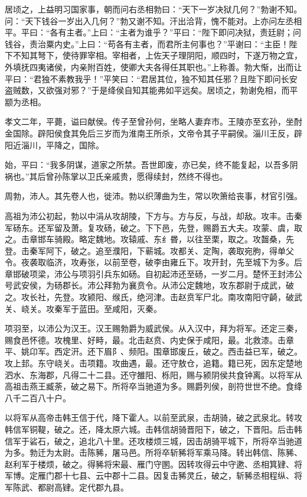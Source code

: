 \documentclass[]{article}
\begin{document}
居顷之，上益明习国家事，朝而问右丞相勃曰：``天下一岁决狱几何？''勃谢不知。问：``天下钱谷一岁出入几何？''勃又谢不知。汗出洽背，愧不能对。上亦问左丞相平。平曰：``各有主者。''上曰：``主者为谁乎？''平曰：``陛下即问决狱，责廷尉；问钱谷，责治粟内史。''上曰：``苟各有主者，而君所主何事也？''平谢曰：``主臣！陛下不知其弩下，使待罪宰相。宰相者，上佐天子理阴阳，顺四时，下遂万物之宜，外填抚四夷诸侯，内亲附百姓，使卿大夫各得任其职也。''上称善。勃大惭，出而让平曰：``君独不素教我乎！''平笑曰：``君居其位，独不知其任邪？且陛下即问长安盗贼数，又欲强对邪？''于是绛侯自知其能弗如平远矣。居顷之，勃谢免相，而平颛为丞相。

孝文二年，平薨，谥曰献侯。传子至曾孙何，坐略人妻弃市。王陵亦至玄孙，坐酎金国除。辟阳侯食其免后三岁而为淮南王所杀，文帝令其子平嗣侯。淄川王反，辟阳近淄川，平降之，国除。

始，平曰：``我多阴谋，道家之所禁。吾世即废，亦已矣，终不能复起，以吾多阴祸也。''其后曾孙陈掌以卫氏亲戚贵，愿得续封，然终不得也。

周勃，沛人。其先卷人也，徙沛。勃以织薄曲为生，常以吹箫给丧事，材官引强。

高祖为沛公初起，勃以中涓从攻胡陵，下方与。方与反，与战，却敌。攻丰。击秦军砀东。还军留及萧。复攻砀，破之。下下邑，先登，赐爵五大夫。攻蒙、虞，取之。击章邯车骑殿。略定魏地。攻辕戚、东纟昬，以往至栗，取之。攻齧桑，先登。击秦军阿下，破之。追至濮阳，下蕲城。攻都关、定陶，袭取宛朐，得单父令。夜袭取临济，攻寿张，以前至卷，破李由雍丘下。攻开封，先至城下为多。后章邯破项梁，沛公与项羽引兵东如砀。自初起沛还至砀，一岁二月。楚怀王封沛公号武安侯，为砀郡长。沛公拜勃为襄贲令。从沛公定魏地，攻东郡尉于成武，破之。攻长社，先登。攻颍阳、缑氏，绝河津。击赵贲军尸北。南攻南阳守齮，破武关、峣关。攻秦军于蓝田。至咸阳，灭秦。

项羽至，以沛公为汉王。汉王赐勃爵为威武侯。从入汉中，拜为将军。还定三秦，赐食邑怀德。攻槐里、好畤，最。北击赵贲、内史保于咸阳，最。北救漆。击章平、姚卬军。西定汧。还下眉阝、频阳。围章邯废丘，破之。西击益已军，破之。攻上邽。东守峣关。击项籍。攻曲遇，最。还守敖仓，追籍。籍已死，因东定楚地泗水、东海郡，凡得二十二县。还守雒阳、栎阳，赐与颍阴侯共食钟离。以将军从高祖击燕王臧荼，破之易下。所将卒当驰道为多。赐爵列侯，剖符世世不绝。食绛八千二百八十户。

以将军从高帝击韩王信于代，降下霍人。以前至武泉，击胡骑，破之武泉北。转攻韩信军铜鞮，破之。还，降太原六城。击韩信胡骑晋阳下，破之，下晋阳。后击韩信军于硰石，破之，追北八十里。还攻楼烦三城，因击胡骑平城下，所将卒当驰道为多。勃迁为太尉。击陈豨，屠马邑。所将卒斩豨将军乘马降。转出韩信、陈豨、赵利军于楼烦，破之。得豨将宋最、雁门守圂。因转攻得云中守遬、丞相箕肄、将军博。定雁门郡十七县、云中郡十二县。因复击豨灵丘，破之，斩豨丞相程纵、将军陈武、都尉高肄。定代郡九县。
\end{document}
